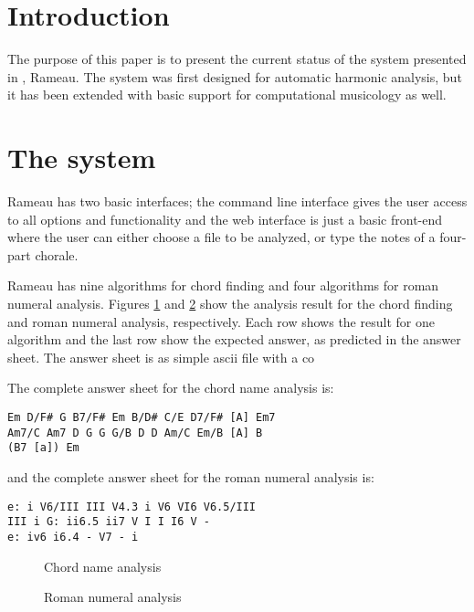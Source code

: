 \section{Introduction}

The purpose of this paper is to present the current status of the
system presented in \cite{kroger08:rameau}, Rameau. The system was
first designed for automatic harmonic analysis, but it has been
extended with basic support for computational musicology as well.

\section{The system}
\label{sec:system}

Rameau has two basic interfaces; the command line interface gives the
user access to all options and functionality and the web interface is
just a basic front-end where the user can either choose a file to be
analyzed, or type the notes of a four-part chorale.

Rameau has nine algorithms for chord finding and four algorithms for
roman numeral analysis. Figures \ref{fig:chord-name-analysis} and
\ref{fig:roman-analysis} show the analysis result for the chord
finding and roman numeral analysis, respectively. Each row shows the
result for one algorithm and the last row show the expected answer, as
predicted  in the answer sheet. The answer
sheet is as simple ascii file with a co 

The complete answer sheet for the chord name analysis is:

\begin{verbatim}
Em D/F# G B7/F# Em B/D# C/E D7/F# [A] Em7
Am7/C Am7 D G G G/B D D Am/C Em/B [A] B 
(B7 [a]) Em
\end{verbatim}

and the complete answer sheet for the roman numeral analysis is:

\begin{verbatim}
e: i V6/III III V4.3 i V6 VI6 V6.5/III
III i G: ii6.5 ii7 V I I I6 V -
e: iv6 i6.4 - V7 - i
\end{verbatim}


\begin{figure}
  \centering
  
  \caption{Chord name analysis}
  \label{fig:chord-name-analysis}
\end{figure}
\begin{figure}
  \centering
  
  \caption{Roman numeral analysis}
  \label{fig:roman-analysis}
\end{figure}

